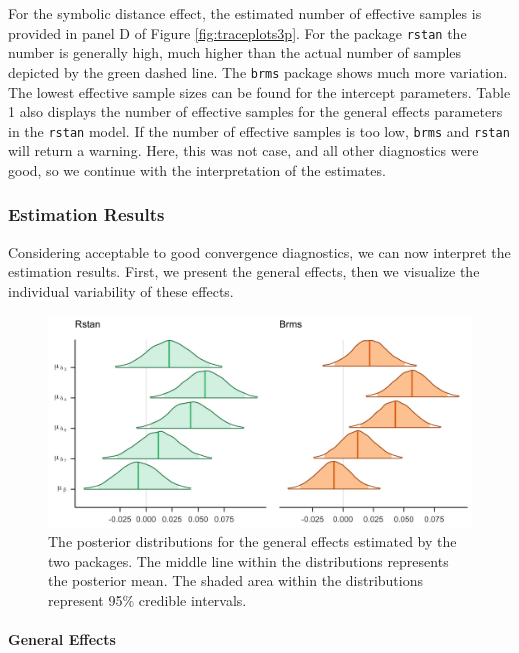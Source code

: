 \documentclass[
  english,
  doc,floatsintext]{apa6}
\let\oldparagraph\paragraph
\renewcommand{\paragraph}[1]{\oldparagraph{#1}\mbox{}}
\begin{document}
For the symbolic distance effect, the estimated number of effective samples is provided in panel D of Figure \ref{fig:traceplots3p}. For the package \texttt{rstan} the number is generally high, much higher than the actual number of samples depicted by the green dashed line. The \texttt{brms} package shows much more variation. The lowest effective sample sizes can be found for the intercept parameters. Table 1 also displays the number of effective samples for the general effects parameters in the \texttt{rstan} model. If the number of effective samples is too low, \texttt{brms} and \texttt{rstan} will return a warning. Here, this was not case, and all other diagnostics were good, so we continue with the interpretation of the estimates.

\hypertarget{estimation-results}{%
\subsubsection{Estimation Results}\label{estimation-results}}

Considering acceptable to good convergence diagnostics, we can now interpret the estimation results. First, we present the general effects, then we visualize the individual variability of these effects.

\begin{figure}[H]

\includegraphics[width=1\linewidth]{Images/Fig9_posteriormu_v2} \hfill{}

\caption{The posterior distributions for the general effects estimated by the two packages. The middle line within the distributions represents the posterior mean. The shaded area within the distributions represent 95\% credible intervals.}\label{fig:modelposteriorsmufigure3}
\end{figure}

\hypertarget{general-effects}{%
\paragraph{General Effects}\label{general-effects}}
\end{document}
